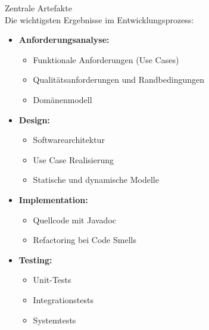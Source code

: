 \begin{theorem}{Zentrale Artefakte}\\
Die wichtigsten Ergebnisse im Entwicklungsprozess:
\begin{itemize}
    \item \textbf{Anforderungsanalyse:}
    \begin{itemize}
        \item Funktionale Anforderungen (Use Cases)
        \item Qualitätsanforderungen und Randbedingungen
        \item Domänenmodell
    \end{itemize}
    \item \textbf{Design:}
    \begin{itemize}
        \item Softwarearchitektur
        \item Use Case Realisierung
        \item Statische und dynamische Modelle
    \end{itemize}
    \item \textbf{Implementation:}
    \begin{itemize}
        \item Quellcode mit Javadoc
        \item Refactoring bei Code Smells
    \end{itemize}
    \item \textbf{Testing:}
    \begin{itemize}
        \item Unit-Tests
        \item Integrationstests
        \item Systemtests
    \end{itemize}
\end{itemize}
\end{theorem}

